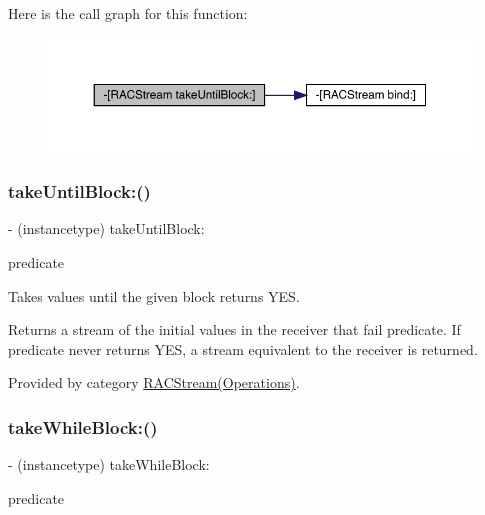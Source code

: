 Here is the call graph for this function\+:\nopagebreak
\begin{figure}[H]
\begin{center}
\leavevmode
\includegraphics[width=350pt]{interface_r_a_c_stream_ac19d57150840e93112646eef310c2489_cgraph}
\end{center}
\end{figure}
\mbox{\label{interface_r_a_c_stream_ac19d57150840e93112646eef310c2489}} 
\subsubsection{\texorpdfstring{take\+Until\+Block\+:()}{takeUntilBlock:()}\hspace{0.1cm}{\footnotesize\ttfamily [3/3]}}
{\footnotesize\ttfamily -\/ (instancetype) take\+Until\+Block\+: \begin{DoxyParamCaption}\item[{(B\+O\+OL($^\wedge$)(id x))}]{predicate }\end{DoxyParamCaption}}

Takes values until the given block returns {\ttfamily Y\+ES}.

Returns a stream of the initial values in the receiver that fail {\ttfamily predicate}. If {\ttfamily predicate} never returns {\ttfamily Y\+ES}, a stream equivalent to the receiver is returned. 

Provided by category \mbox{\hyperlink{category_r_a_c_stream_07_operations_08_ac19d57150840e93112646eef310c2489}{R\+A\+C\+Stream(\+Operations)}}.

\mbox{\label{interface_r_a_c_stream_ae3b27f126fffcf5dfb8eaa6bd71c5fc4}} 
\subsubsection{\texorpdfstring{take\+While\+Block\+:()}{takeWhileBlock:()}\hspace{0.1cm}{\footnotesize\ttfamily [1/3]}}
{\footnotesize\ttfamily -\/ (instancetype) take\+While\+Block\+: \begin{DoxyParamCaption}\item[{(B\+O\+OL($^\wedge$)(id x))}]{predicate }\end{DoxyParamCaption}}

